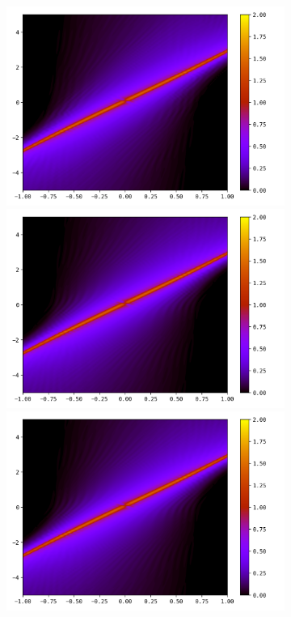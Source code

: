\documentclass{article}
\numberwithin{equation}{section}
\newcommand{\imh}{\textheight} %
\newcommand{\imw}{\textwidth} %
\begin{document}
\begin{figure}
	\begin{subfigure}{\textwidth}
		\centering
		\includegraphics[height=\imh,width=\imw]{images/fiT20_run5af.png}
		\includegraphics[height=\imh,width=\imw]{images/fiT20_run5af_2.png}
		\includegraphics[height=\imh,width=\imw]{images/fiT20_run5af_3.png}

\end{subfigure}
\end{figure}
\end{document}

